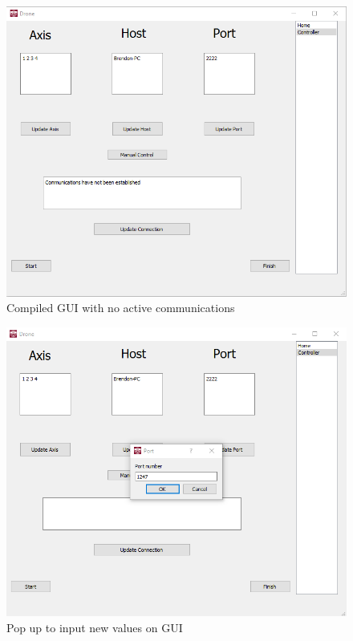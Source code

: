 \begin{figure}[H]
	\includegraphics[width=\linewidth]{GUICtrlPop.png}
	\caption{Compiled GUI with no active communications}
	\label{fig:guipop1}
\end{figure}

\begin{figure}[H]
	\includegraphics[width=\linewidth]{GUIPopup.png}
	\caption{Pop up to input new values on GUI}
	\label{fig:popup}
\end{figure}

